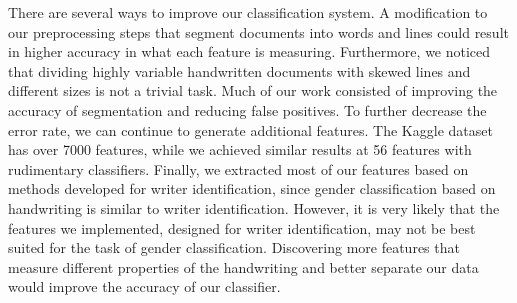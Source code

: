 \documentclass[paper=a4, fontsize=11pt]{scrartcl} %
\numberwithin{equation}{section} %
\numberwithin{figure}{section} %
\numberwithin{table}{section} %
\begin{document}
There are several ways to improve our classification system. A
modification to our preprocessing steps that segment documents into
words and lines could result in higher accuracy in what each feature
is measuring. Furthermore, we noticed that dividing highly variable
handwritten documents with skewed lines and different sizes is not a
trivial task. Much of our work consisted of improving the accuracy of
segmentation and reducing false positives. To further decrease the
error rate, we can continue to generate additional features. The
Kaggle dataset has over 7000 features, while we achieved similar
results at 56 features with rudimentary classifiers. Finally, we
extracted most of our features based on methods developed for writer
identification, since gender classification based on handwriting is
similar to writer identification. However, it is very likely that the
features we implemented, designed for writer identification, may not
be best suited for the task of gender classification. Discovering more
features that measure different properties of the handwriting and
better separate our data would improve the accuracy of our classifier.



\end{document}
